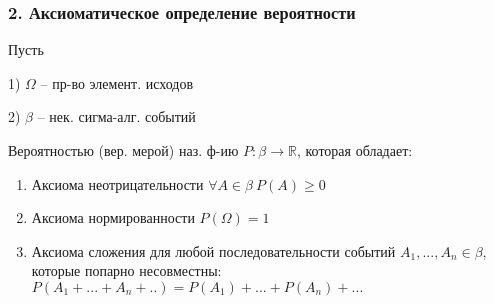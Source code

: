 \subsubsection*{2. Аксиоматическое определение вероятности}

Пусть 

1) $\Omega$ -- пр-во элемент. исходов 

2) $\beta$ -- нек. сигма-алг. событий

\OPR Вероятностью (вер. мерой) наз. ф-ию $P:\beta\rightarrow\mathbb{R}$, которая обладает:
\begin{enumerate}[topsep=0pt, leftmargin=20pt, noitemsep, label=\arabic*\degree]
	\item Аксиома неотрицательности $\forall A\in \beta~P(A)\geq 0$
	
	\item Аксиома нормированности $P(\Omega) = 1$
	
	\item Аксиома сложения для любой последовательности событий $A_1,...,A_n\in \beta$, которые попарно несовместны: $P(A_1+...+A_n+..)=P(A_1)+...+P(A_n)+...$
	
\end{enumerate}

\clearpage
